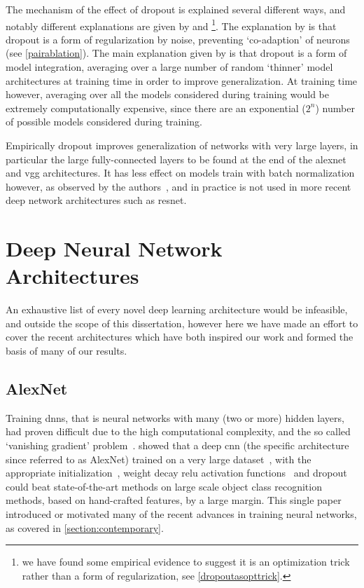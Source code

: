 \documentclass[thesis]{subfiles}
\begin{document}
The mechanism of the effect of dropout is explained several different ways, and notably different explanations are given by \citet{dropout} and \citet{dropoutjmlr}\footnote{we have found some empirical evidence to suggest it is an optimization trick rather than a form of regularization, see \cref{dropoutasopttrick}.}. The explanation by \citet{dropout} is that dropout is a form of regularization by noise, preventing `co-adaption' of neurons (see \cref{pairablation}). The main explanation given by \citet{dropoutjmlr} is that dropout is a form of model integration, averaging over a large number of random `thinner' model architectures at training time in order to improve generalization. At training time however, averaging over all the models considered during training would  be extremely computationally expensive, since there are an exponential ($2^n$) number of possible models considered during training.

Empirically dropout improves generalization of networks with very large layers, in particular the large fully-connected layers to be found at the end of the \gls{alexnet} and \gls{vgg} architectures. It has less effect on models train with batch normalization however, as observed by the authors~\citep{Ioffe2015}, and in practice is not used in more recent deep network architectures such as \gls{resnet}.

\section{Deep Neural Network Architectures}
An exhaustive list of every novel deep learning architecture would be infeasible, and outside the scope of this dissertation, however here we have made an effort to cover the recent architectures which have both inspired our work and formed the basis of many of our results.

\subsection{AlexNet}
Training \glspl{dnn}, that is neural networks with many (\ie two or more) hidden layers, had proven difficult due to the high computational complexity, and the so called `vanishing gradient' problem~\citep{bengio:ieeenn94}. \citet{Krizhevsky2012} showed that a deep \gls{cnn} (the specific architecture since referred to as AlexNet) trained on a very large dataset~\citep{ILSVRC2015}, with the appropriate initialization~\citep{Sutskever2013momentum}, weight decay \gls{relu} activation functions~\citep{conf/icml/NairH10} and dropout~\citep{Hinton2012} could beat state-of-the-art methods on large scale object class recognition methods, based on hand-crafted features, by a large margin. This single paper introduced or motivated many of the recent advances in training neural networks, as covered in \cref{section:contemporary}.
\end{document}
